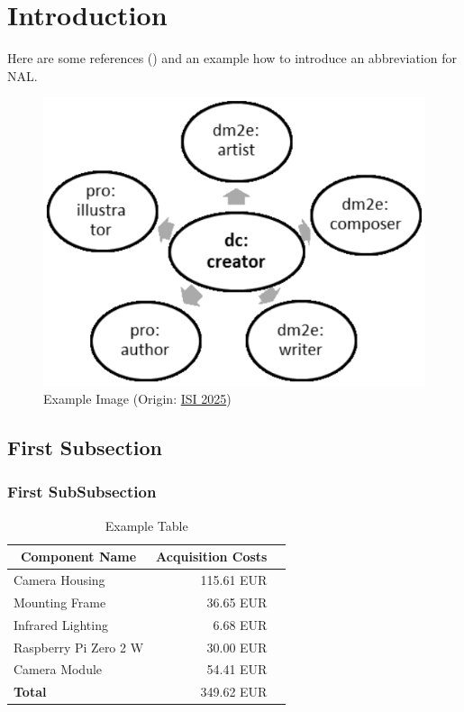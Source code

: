 \section{Introduction}
\lipsum[1] Here are some references (\cite{almero2021,borenstein1992,cazenave2014,coro2021}) and an example how to introduce an abbreviation for \ac{NAL}.

\begin{figure}
    \centering
    \includegraphics[width=0.6 \textwidth]{images/exampleFigure.png}
    \caption{Example Image (Origin: \href{https://isi2025.informationswissenschaft.org/wp-content/uploads/2024/05/Formatierungshinweise_ISI_2025.pdf}{ISI 2025})}
    \label{fig:exampleFigure}
\end{figure}

\subsection{First Subsection}
\lipsum[2]

\subsubsection{First SubSubsection}
\lipsum[3]

\lipsum[5]

\begin{table}[h]
	\centering
	\caption{Example Table}\label{tab:exampleTable}
		\begin{tabular}{|l|r|r|}
			\hline
			\multicolumn{1}{|c|}{\textbf{Component Name}} & \multicolumn{1}{c|}{\textbf{Acquisition Costs}} \\ \hline
			Camera Housing                                & 115.61 EUR  \\
			Mounting Frame                                & 36.65 EUR  \\
			Infrared Lighting                             & 6.68 EUR    \\
			Raspberry Pi Zero 2 W                         & 30.00 EUR   \\
			Camera Module                                 & 54.41 EUR    \\
            \hline
			\textbf{Total}                                & 349.62 EUR    \\ 
            \hline
		\end{tabular}
\end{table}
